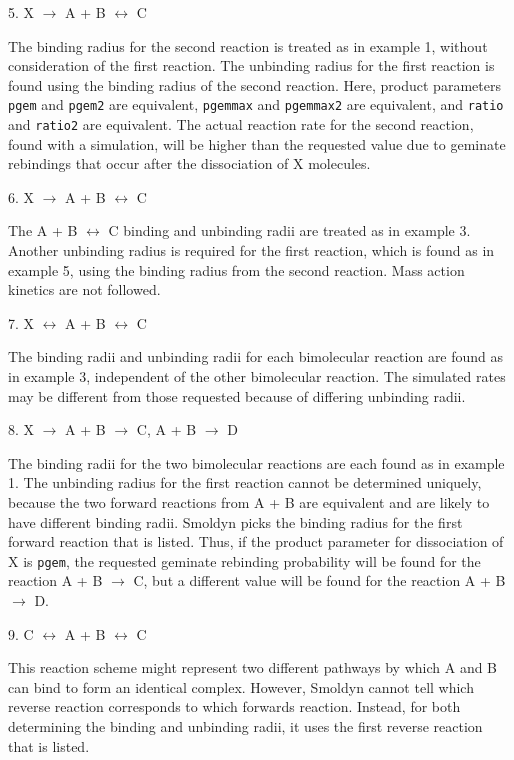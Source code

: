 \documentclass {book}
\newcommand {\ttt} {\texttt}
\begin{document}
\begin{description}
\item{5. X $\rightarrow$ A + B $\leftrightarrow$ C}

The binding radius for the second reaction is treated as in example 1, without consideration of the first reaction. The unbinding radius for the first reaction is found using the binding radius of the second reaction. Here, product parameters \ttt{pgem} and \ttt{pgem2} are equivalent, \ttt{pgemmax} and \ttt{pgemmax2} are equivalent, and \ttt{ratio} and \ttt{ratio2} are equivalent. The actual reaction rate for the second reaction, found with a simulation, will be higher than the requested value due to geminate rebindings that occur after the dissociation of X molecules.

\item{6. X $\rightarrow$ A + B $\leftrightarrow$ C}

The A + B $\leftrightarrow$ C binding and unbinding radii are treated as in example 3. Another unbinding radius is required for the first reaction, which is found as in example 5, using the binding radius from the second reaction. Mass action kinetics are not followed.

\item{7. X $\leftrightarrow$ A + B $\leftrightarrow$ C}

The binding radii and unbinding radii for each bimolecular reaction are found as in example 3, independent of the other bimolecular reaction. The simulated rates may be different from those requested because of differing unbinding radii.

\item{8. X $\rightarrow$ A + B $\rightarrow$ C,   A + B $\rightarrow$ D}

The binding radii for the two bimolecular reactions are each found as in example 1. The unbinding radius for the first reaction cannot be determined uniquely, because the two forward reactions from A + B are equivalent and are likely to have different binding radii. Smoldyn picks the binding radius for the first forward reaction that is listed. Thus, if the product parameter for dissociation of X is \ttt{pgem}, the requested geminate rebinding probability will be found for the reaction A + B $\rightarrow$ C, but a different value will be found for the reaction A + B $\rightarrow$ D.

\item{9. C $\leftrightarrow$ A + B $\leftrightarrow$ C}

This reaction scheme might represent two different pathways by which A and B can bind to form an identical complex. However, Smoldyn cannot tell which reverse reaction corresponds to which forwards reaction. Instead, for both determining the binding and unbinding radii, it uses the first reverse reaction that is listed.
\end{description}
\end{document}
